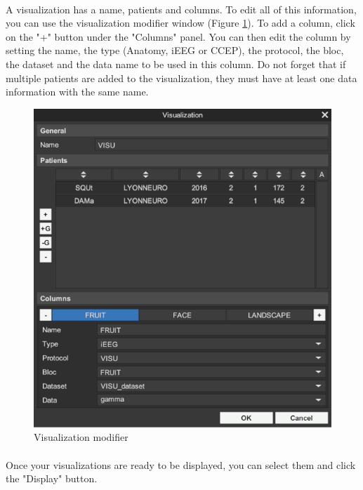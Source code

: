 \documentclass[a4paper]{article}
\begin{document}
\paragraph{} A visualization has a name, patients and columns. To edit all of this information, you can use the visualization modifier window (Figure \ref{visuModifierUI}). To add a column, click on the "+" button under the "Columns" panel. You can then edit the column by setting the name, the type (Anatomy, iEEG or CCEP), the protocol, the bloc, the dataset and the data name to be used in this column. Do not forget that if multiple patients are added to the visualization, they must have at least one data information with the same name.
\begin{figure}[H]
\begin{center}
\includegraphics[scale=0.4]{VisualizationModifier.png}
\end{center}
\caption{\label{visuModifierUI}Visualization modifier}
\end{figure}
\paragraph{} Once your visualizations are ready to be displayed, you can select them and click the "Display" button.
\end{document}
